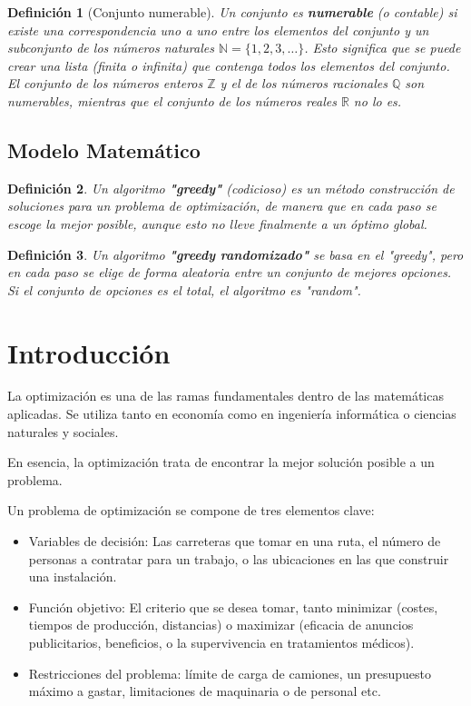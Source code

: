 \documentclass[12pt,a4paper]{book}
\newtheorem{defi}{Definición}[section]
\begin{document}
\begin{defi}[Conjunto numerable]
Un conjunto es \textbf{numerable} (o contable) si existe una correspondencia uno a uno entre los elementos del conjunto y un subconjunto de los números naturales $\mathbb{N} = \{1, 2, 3, \dots\}$. Esto significa que se puede crear una lista (finita o infinita) que contenga todos los elementos del conjunto. El conjunto de los números enteros $\mathbb{Z}$ y el de los números racionales $\mathbb{Q}$ son numerables, mientras que el conjunto de los números reales $\mathbb{R}$ no lo es.
\end{defi}
\section{Modelo Matemático}

\begin{defi}
Un algoritmo \textbf{"greedy"} (codicioso) es un método construcción de soluciones para un problema de optimización,
de manera que en cada paso se escoge la mejor posible, aunque esto no lleve finalmente a un óptimo global.
\end{defi}

\bigskip

\begin{defi}
Un algoritmo \textbf{"greedy randomizado"} se basa en el "greedy", pero en cada paso se elige de forma aleatoria entre un conjunto de mejores opciones.
Si el conjunto de opciones es el total, el algoritmo es "random".
\end{defi}

\chapter{Introducción}
La optimización es una de las ramas fundamentales dentro de las matemáticas aplicadas.  Se utiliza tanto en economía como en ingeniería informática o ciencias naturales y sociales.

En esencia, la optimización trata de encontrar la mejor solución posible a un problema.

Un problema de optimización se compone de tres elementos clave:
\begin{itemize}
    \item Variables de decisión: Las carreteras que tomar en una ruta, el número de personas a contratar para un trabajo, o las ubicaciones en las que construir una instalación.
    \item Función objetivo: El criterio que se desea tomar, tanto minimizar (costes, tiempos de producción, distancias) o maximizar (eficacia de anuncios publicitarios, beneficios, o la supervivencia en tratamientos médicos).
    \item Restricciones del problema: límite de carga de camiones, un presupuesto máximo a gastar, limitaciones de maquinaria o de personal etc.
\end{itemize}
\end{document}
